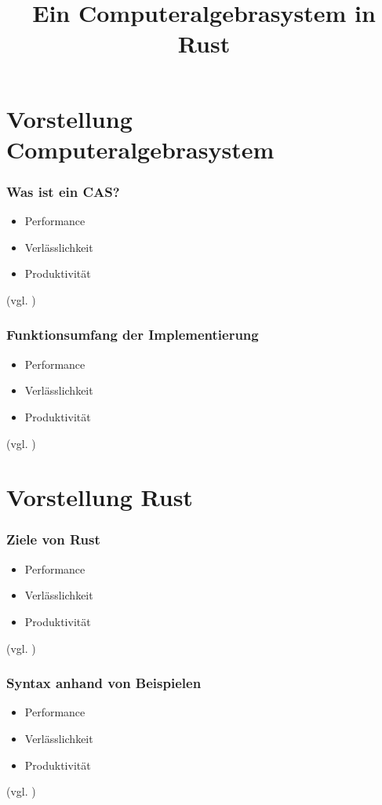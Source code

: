 \documentclass{beamer}
\title{Ein Computeralgebrasystem in Rust}
\begin{document}
\maketitle
{}

\section{Vorstellung Computeralgebrasystem}
\begin{frame}[fragile]
  \frametitle{Was ist ein CAS?}
  \begin{itemize}
    \item Performance
    \pause
    \item Verlässlichkeit
    \pause
    \item Produktivität
  \end{itemize}
  {\small (vgl. \cite{WhyRust})}
\end{frame}

\begin{frame}[fragile]
  \frametitle{Funktionsumfang der Implementierung}
  \begin{itemize}
    \item Performance
    \pause
    \item Verlässlichkeit
    \pause
    \item Produktivität
  \end{itemize}
  {\small (vgl. \cite{WhyRust})}
\end{frame}

\section{Vorstellung Rust}
\begin{frame}[fragile]
  \frametitle{Ziele von Rust}
  \begin{itemize}
    \item Performance
    \pause
    \item Verlässlichkeit
    \pause
    \item Produktivität
  \end{itemize}
  {\small (vgl. \cite{WhyRust})}
\end{frame}

\begin{frame}[fragile]
  \frametitle{Syntax anhand von Beispielen}
  \begin{itemize}
    \item Performance
    \pause
    \item Verlässlichkeit
    \pause
    \item Produktivität
  \end{itemize}
  {\small (vgl. \cite{WhyRust})}
\end{frame}
\end{document}

